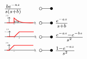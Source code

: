 \begin{footnotesize}
\[\begin{array}{@{}l@{ ~ \laplace ~ }l@{}}
    \frac{b e^{-as}}{s (s + b)} \\
\begin{tikzpicture}[domain=0:5, scale=\graphtabscale, every node/.style={scale=\graphtabscale}]
    \draw[->] (-1,0) -- (5.5,0) node[below] {$t$};
    \draw[->] (0,-0.1) -- (0,1.2) node[above left] {$f(t)$};
    \draw[-] (-0.1,1) node[left] {$1$} -- (0.1,1);
    \draw[thick, red] 
        (-0.5,0)
        --
        (1,0) node[below, black] {$a$}
        --
        (1,1)
        to [out=-45, in=180]
        (5,0);
    \draw[dotted] (1,1) -- (2,0) -- (2,0.3);
    \draw[<->] (1,0.2) -- node[above] {$\frac{1}{b}$} (2,0.2);
\end{tikzpicture} &
    \frac{e^{-as}}{s + b} \\
\begin{tikzpicture}[domain=0:5, scale=\graphtabscale, every node/.style={scale=\graphtabscale}]
    \draw[->] (-1,0) -- (5.5,0) node[below] {$t$};
    \draw[->] (0,-0.1) -- (0,1.2) node[above left] {$f(t)$};
    \draw[-] (-0.1,1) node[left] {$b-a$} -- (0.1,1);
    \draw[thick, red] 
        (-0.5,0)
        --
        (1,0) node[below, black] {$a$}
        --
        (2,1)
        --
        (5,1);
    \draw[dotted] (2,1) -- (2,0) node[below] {$b$};
\end{tikzpicture} &
    \frac{e^{-as} - e^{-bs}}{s^2} \\
\begin{tikzpicture}[domain=0:5, scale=\graphtabscale, every node/.style={scale=\graphtabscale}]
    \draw[->] (-1,0) -- (5.5,0) node[below] {$t$};
    \draw[->] (0,-0.1) -- (0,1.2) node[above left] {$f(t)$};
    \draw[-] (-0.1,1) node[left] {$a$} -- (0.1,1);
    \draw[thick, red] 
        (-0.5,0)
        --
        (0,0)
        --
        (1,1)
        --
        (5,1);
    \draw[dotted] (1,1) -- (1,0) node[below] {$a$};
\end{tikzpicture} &
    \frac{1 - e^{-as}}{s^2}
\end{array} \]


\end{footnotesize}
